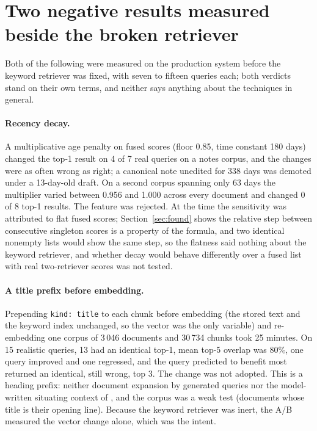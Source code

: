\documentclass[11pt]{article}
\begin{document}



\appendix
\section{Two negative results measured beside the broken retriever}
\label{app:negative}

Both of the following were measured on the production system before the keyword retriever was fixed, with seven to fifteen queries each; both verdicts stand on their own terms, and neither says anything about the techniques in general.

\paragraph{Recency decay.} A multiplicative age penalty on fused scores (floor 0.85, time constant 180 days) changed the top-1 result on 4 of 7 real queries on a notes corpus, and the changes were as often wrong as right; a canonical note unedited for 338 days was demoted under a 13-day-old draft. On a second corpus spanning only 63 days the multiplier varied between 0.956 and 1.000 across every document and changed 0 of 8 top-1 results. The feature was rejected. At the time the sensitivity was attributed to flat fused scores; Section~\ref{sec:found} shows the relative step between consecutive singleton scores is a property of the formula, and two identical nonempty lists would show the same step, so the flatness said nothing about the keyword retriever, and whether decay would behave differently over a fused list with real two-retriever scores was not tested.

\paragraph{A title prefix before embedding.} Prepending \texttt{kind: title} to each chunk before embedding (the stored text and the keyword index unchanged, so the vector was the only variable) and re-embedding one corpus of 3\,046 documents and 30\,734 chunks took 25 minutes. On 15 realistic queries, 13 had an identical top-1, mean top-5 overlap was 80\%, one query improved and one regressed, and the query predicted to benefit most returned an identical, still wrong, top 3. The change was not adopted. This is a heading prefix: neither document expansion by generated queries \citep{nogueira2019doc2query} nor the model-written situating context of \citet{anthropic2024contextual}, and the corpus was a weak test (documents whose title is their opening line). Because the keyword retriever was inert, the A/B measured the vector change alone, which was the intent.
\end{document}
